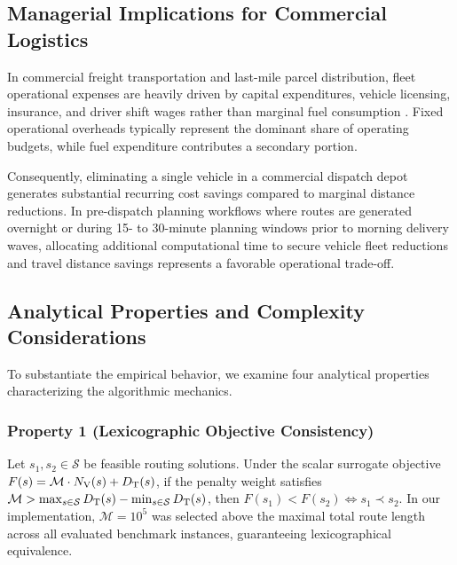 \subsection{Managerial Implications for Commercial Logistics}
\label{sec:disc_managerial}

In commercial freight transportation and last-mile parcel distribution, fleet operational expenses are heavily driven by capital expenditures, vehicle licensing, insurance, and driver shift wages rather than marginal fuel consumption \cite{Toth2014, braysy2005vehicle}. Fixed operational overheads typically represent the dominant share of operating budgets, while fuel expenditure contributes a secondary portion.

Consequently, eliminating a single vehicle in a commercial dispatch depot generates substantial recurring cost savings compared to marginal distance reductions. In pre-dispatch planning workflows where routes are generated overnight or during 15- to 30-minute planning windows prior to morning delivery waves, allocating additional computational time to secure vehicle fleet reductions and travel distance savings represents a favorable operational trade-off.

\subsection{Analytical Properties and Complexity Considerations}
\label{sec:disc_theory}

To substantiate the empirical behavior, we examine four analytical properties characterizing the algorithmic mechanics.

\subsubsection{Property 1 (Lexicographic Objective Consistency)}
\label{prop:lex_consistency}
Let $s_1, s_2 \in \mathcal{S}$ be feasible routing solutions. Under the scalar surrogate objective $F(s) = \mathcal{M} \cdot {N_\mathrm{V}}(s) + {D_\mathrm{T}}(s)$, if the penalty weight satisfies $\mathcal{M} > \max_{s \in \mathcal{S}} {D_\mathrm{T}}(s) - \min_{s \in \mathcal{S}} {D_\mathrm{T}}(s)$, then $F(s_1) < F(s_2) \iff s_1 \prec s_2$. In our implementation, $\mathcal{M} = 10^5$ was selected above the maximal total route length across all evaluated benchmark instances, guaranteeing lexicographical equivalence.

